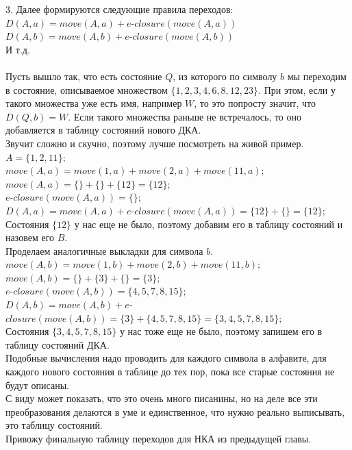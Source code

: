 \documentclass[14pt]{extreport}
\begin{document}
	3. Далее формируются следующие правила переходов:\\
	$D(A, a) = move(A, a)+e$-$closure(move(A, a))$\\
	$D(A, b) = move(A, b)+e$-$closure(move(A, b))$\\
	И т.д.\\\\
	Пусть вышло так, что есть состояние $Q$, из которого по символу $b$ мы переходим в состояние,
	описываемое множеством $\{1, 2, 3, 4, 6, 8, 12, 23\}$. При этом, если у такого множества уже
	есть имя, например $W$, то это попросту значит, что $D(Q, b)=W$. Если такого множества раньше
	не встречалось, то оно добавляется в таблицу состояний нового ДКА.\\
	Звучит сложно и скучно, поэтому лучше посмотреть на живой пример.\\
	$A=\{1, 2, 11\};$\\
	$move(A, a) = move(1, a)+move(2, a)+move(11,a);$\\
	$move(A,a)=\{\}+\{\}+\{12\}=\{12\};$\\
	$e$-$closure(move(A, a))=\{\};$\\
	$D(A, a) = move(A, a)+e$-$closure(move(A, a))=\{12\}+\{\}=\{12\};$\\
	Состояния $\{12\}$ у нас еще не было, поэтому добавим его в таблицу состояний и назовем его
	$B$.\\
	Проделаем аналогичные выкладки для символа $b$.\\
	$move(A, b) = move(1, b)+move(2, b)+move(11,b);$\\
	$move(A, b) = \{\}+\{3\}+\{\}=\{3\};$\\
	$e$-$closure(move(A, b))=\{4, 5, 7, 8, 15\};$\\
	$D(A, b) = move(A, b)+e$-$closure(move(A, b))=\{3\}+\{4, 5, 7, 8, 15\}=
	\{3, 4, 5, 7, 8, 15\};$\\
	Состояния $\{3, 4, 5, 7, 8, 15\}$ у нас тоже еще не было, поэтому запишем его в таблицу
	состояний ДКА.\\
	Подобные вычисления надо проводить для каждого символа в алфавите, для каждого нового
	состояния в таблице до тех пор, пока все старые состояния не будут описаны.\\
	С виду может показать, что это очень много писанины, но на деле все эти преобразования
	делаются в уме и единственное, что нужно реально выписывать, это таблицу состояний.\\
	Привожу финальную таблицу переходов для НКА из предыдущей главы.\\
\end{document}
